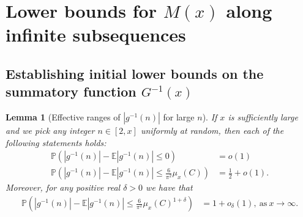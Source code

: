 \documentclass[11pt,reqno,a4letter]{article}
\numberwithin{figure}{section}
\numberwithin{table}{section}
\theoremstyle{plain}
\newtheorem{lemma}[theorem]{Lemma}
\numberwithin{theorem}{section}
\theoremstyle{definition}
\begin{document}
\newpage 
\section{Lower bounds for $M(x)$ along infinite subsequences} 
\label{Section_KeyApplications} 

\subsection{Establishing initial lower bounds on the summatory function $G^{-1}(x)$} 
\label{Section_ProofOfValidityOfAverageOrderLowerBounds} 

\begin{lemma}[Effective ranges of $|g^{-1}(n)|$ for large $n$] 
\label{lemma_ProbsOfAbsgInvnDist_v2} 
If $x$ is sufficiently large and we pick any integer $n \in [2, x]$ uniformly at random, then 
each of the following statements holds: 
\begin{align*} 
\tag{A}
\mathbb{P}\left(|g^{-1}(n)| - \mathbb{E}|g^{-1}(n)| \leq 0\right) & = o(1) \\ 
\tag{B} 
\mathbb{P}\left(|g^{-1}(n)| - \mathbb{E}|g^{-1}(n)| \leq \frac{6}{\pi^2} \mu_x(C)\right) & = 
     \frac{1}{2} + o(1). 
\end{align*} 
Moreover, for any positive real $\delta > 0$ we have that 
\begin{align*} 
\tag{C} 
\mathbb{P}\left(|g^{-1}(n)| - \mathbb{E}|g^{-1}(n)| \leq \frac{6}{\pi^2} \mu_x(C)^{1 + \delta}\right) & = 
     1 + o_{\delta}(1), 
     \mathrm{\ as\ } x \rightarrow \infty. 
\end{align*} 
\end{lemma} 
\end{document}
